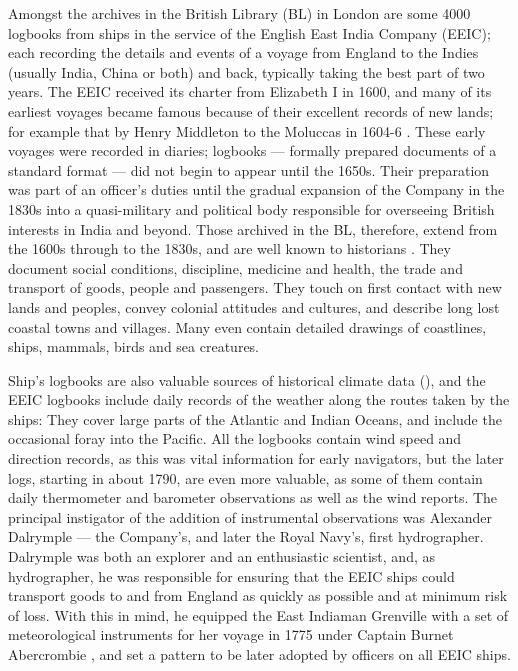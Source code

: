 \documentclass[CP]{copernicus}
\begin{document}
Amongst the archives in the British Library (BL) in London are some 4000 logbooks from ships in the service of the English East India Company (EEIC); each recording the details and events of a voyage from England to the Indies (usually India, China or both) and back, typically taking the best part of two years. The EEIC received its charter from Elizabeth I in 1600, and many of its earliest voyages became famous because of their excellent records of new lands; for example that by Henry Middleton to the Moluccas in 1604-6 \citep{Foster10}. These early voyages were recorded in diaries; logbooks --- formally prepared documents of a standard format --- did not begin to appear until the 1650s. Their preparation was part of an officer's duties until the gradual expansion of the Company in the 1830s into a quasi-military and political body responsible for overseeing British interests in India and beyond. Those archived in the BL, therefore, extend from the 1600s through to the 1830s, and are well known to historians \citep{Farrington99}. They document social conditions, discipline, medicine and health, the trade and transport of goods, people and passengers. They touch on first contact with new lands and peoples, convey colonial attitudes and cultures, and describe long lost coastal towns and villages. Many even contain detailed drawings of coastlines, ships, mammals, birds and sea creatures.    

Ship's logbooks are also valuable sources of historical climate data (\citet{chenoweth96,wheeler06cliwoc,brohan09digitisation,brohan10corral}), and the EEIC logbooks include daily records of the weather along the routes taken by the ships: They cover large parts of the Atlantic and Indian Oceans, and include the occasional foray into the Pacific. All the logbooks contain wind speed and direction records, as this was vital information for early navigators, but the later logs, starting in about 1790, are even more valuable, as some of them contain daily thermometer and barometer observations as well as the wind reports. The principal instigator of the addition of instrumental observations was Alexander Dalrymple --- the Company's, and later the Royal Navy's, first hydrographer. Dalrymple was both an explorer and an enthusiastic scientist, and, as hydrographer, he was responsible for ensuring that the EEIC ships could transport goods to and from England as quickly as possible and at minimum risk of loss. With this in mind, he equipped the East Indiaman Grenville with a set of meteorological instruments for her voyage in 1775 under Captain Burnet Abercrombie \citep{Dalrymple78}, and set a pattern to be later adopted by officers on all EEIC ships. 
\end{document}
